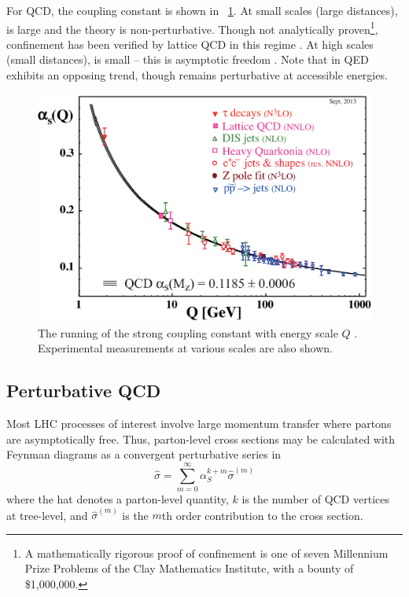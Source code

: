 For \ac{QCD}, the coupling constant \alphaS is shown in \Figure~\ref{fig:alpha_s}. At 
small scales (large distances), \alphaS is large and the theory is non-perturbative. 
Though not analytically proven\footnote{
	A mathematically rigorous proof of confinement is one of seven Millennium Prize 
	Problems of the Clay Mathematics Institute, with a bounty of \$1,000,000.
}, confinement has been verified by lattice \ac{QCD} in this regime \cite{Wilson:1974}. 
At high scales (small distances), \alphaS is small -- this is asymptotic freedom 
\cite{Gross:1973,Politzer:1973}. Note that \alphaEM in \acs{QED} exhibits an opposing 
trend, though remains perturbative at accessible energies.
\begin{figure}
	\includegraphics[width=\mediumfigwidth]{tex/tools/alpha_s}
	\caption{The running of the strong coupling constant \alphaS with energy scale $Q$ 
	\cite{PDG:2012}. Experimental measurements at various scales are also shown.}
	\label{fig:alpha_s}
\end{figure}



\subsection{Perturbative QCD}
\label{sec:qcd:pqcd}

Most \acs{LHC} processes of interest involve large momentum transfer where partons are 
asymptotically free. Thus, parton-level cross sections may be calculated with Feynman 
diagrams as a convergent perturbative series in \alphaS
\begin{equation}
	\hat{\sigma} = \sum\limits_{m=0}^{\infty} \alpha_S^{k+m} \hat{\sigma}^{(m)}
\end{equation}
where the hat denotes a parton-level quantity, $k$ is the number of \ac{QCD} vertices at 
tree-level, and $\hat{\sigma}^{(m)}$ is the $m$th order contribution to the cross section.

